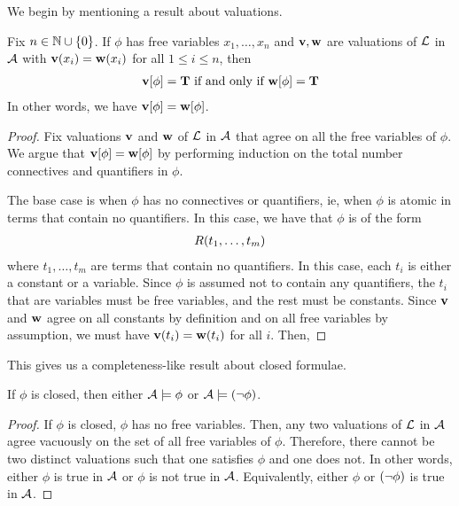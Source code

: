 We begin by mentioning a result about valuations.

\begin{boxtheorem}
    Fix $n \in \mathbb{N} \cup \left\{ 0 \right\}$. If $\phi$ has free variables $x_1, \ldots, x_n$ and $\mathbf{v}, \mathbf{w}$ are valuations of $\mathcal{L}$ in $\mathcal{A}$ with $\mathbf{v}\!\left( x_i \right) = \mathbf{w}\!\left( x_i \right)$ for all $1 \leq i \leq n$, then
    \begin{align*}
        \mathbf{v}\!\left[ \phi \right] = \mathbf{T} \text{ if and only if } \mathbf{w}\!\left[ \phi \right] = \mathbf{T}
    \end{align*}
    In other words, we have $\mathbf{v}\!\left[ \phi \right] = \mathbf{w}\!\left[ \phi \right]$.
\end{boxtheorem}
\begin{proof}
    Fix valuations $\mathbf{v}$ and $\mathbf{w}$ of $\mathcal{L}$ in $\mathcal{A}$ that agree on all the free variables of $\phi$. We argue that $\mathbf{v}\!\left[ \phi \right] = \mathbf{w}\!\left[ \phi \right]$ by performing induction on the total number connectives and quantifiers in $\phi$.

    The base case is when $\phi$ has no connectives or quantifiers, ie, when $\phi$ is atomic in terms that contain no quantifiers. In this case, we have that $\phi$ is of the form
    \begin{align*}
        R\!\left( t_1, \ldots, t_m \right)
    \end{align*}
    where $t_1, \ldots, t_m$ are terms that contain no quantifiers. In this case, each $t_i$ is either a constant or a variable. Since $\phi$ is assumed not to contain any quantifiers, the $t_i$ that are variables must be free variables, and the rest must be constants. Since $\mathbf{v}$ and $\mathbf{w}$ agree on all constants by definition and on all free variables by assumption, we must have
    $\mathbf{v}\!\left( t_i \right) = \mathbf{w}\!\left( t_i \right)$ for all $i$. Then, \sorry
\end{proof}

This gives us a completeness-like result about closed formulae.

\begin{boxcorollary}
    If $\phi$ is closed, then either $\mathcal{A} \models \phi$ or $\mathcal{A} \models \left( \neg \phi \right)$.
\end{boxcorollary}
\begin{proof}
    If $\phi$ is closed, $\phi$ has no free variables. Then, any two valuations of $\mathcal{L}$ in $\mathcal{A}$ agree vacuously on the set of all free variables of $\phi$. Therefore, there cannot be two distinct valuations such that one satisfies $\phi$ and one does not. In other words, either $\phi$ is true in $\mathcal{A}$ or $\phi$ is not true in $\mathcal{A}$. Equivalently, either $\phi$ or $\left( \neg \phi \right)$ is true in $\mathcal{A}$. 
\end{proof}

